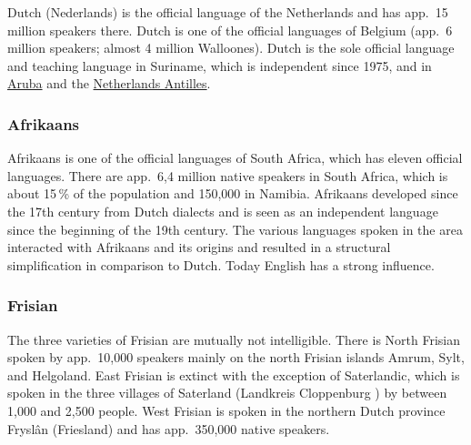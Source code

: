 Dutch (Nederlands) is the  official language of the Netherlands and has app.\, 15 million speakers
there. Dutch is one of the official languages of Belgium (app.\ 6 million speakers; almost 4 million
Walloones). Dutch is the sole official language and teaching language in Suriname, which is
independent since 1975, 
and in \href{https://en.wikipedia.org/wiki/Aruba}{Aruba} and the \href{https://en.wikipedia.org/wiki/Netherlands_Antilles}{Netherlands Antilles}.


\subsubsection{Afrikaans}

Afrikaans is one of the official languages of South Africa, which has eleven official languages.
There are app.\ 6,4 million native speakers in South Africa, which is about 15\,\% of the population
and 150,000 in Namibia. Afrikaans developed since the 17th century from Dutch dialects and is seen
as an independent language since the beginning of the 19th century. The various languages spoken in
the area interacted with Afrikaans and its origins and resulted in a structural simplification in
comparison to Dutch. Today English has a strong influence.



\subsubsection{Frisian}

The three varieties of Frisian are mutually not intelligible. There is North Frisian spoken by
app.\ 10,000 speakers mainly on the north Frisian islands Amrum, Sylt, and Helgoland. East Frisian
is extinct with the exception of Saterlandic, which is spoken in the three villages of Saterland
(Landkreis Cloppenburg ) by between 1,000 and  2,500 people.
West Frisian is spoken in the northern Dutch province Fryslân (Friesland) and has app.\  350,000
native speakers.



